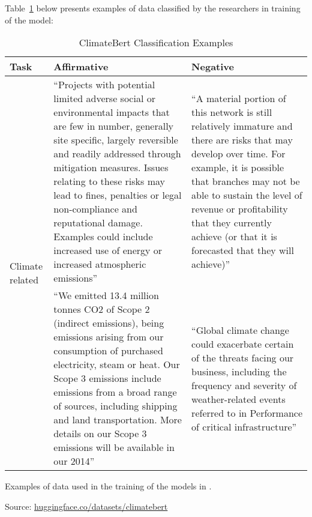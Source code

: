 \documentclass[12pt]{article}
\begin{document}
Table~\ref{data:cti:model_tab} below presents examples of data classified by the researchers in training of the model:

\begin{table}[ht]
    \caption{ClimateBert Classification Examples}\label{data:cti:model_tab}
    \centering
    \small
    \begin{tabular}{l|p{6cm}|p{6cm}}
        \toprule
        Task & Affirmative & Negative \\
        \midrule
        \multirow{8}{*}{Climate related} & ``Projects with potential limited adverse social or environmental impacts that are few in number, generally site specific, largely reversible and readily addressed through mitigation measures. Issues relating to these risks may lead to fines, penalties or legal non-compliance and reputational damage. Examples could include increased use of energy or increased atmospheric emissions'' & ``A material portion of this network is still relatively immature and there are risks that may develop over time. For example, it is possible that branches may not be able to sustain the level of revenue or profitability that they currently achieve (or that it is forecasted that they will achieve)'' \\
        \midrule
        \multirow{8}{*}{Specific} & ``We emitted 13.4 million tonnes CO2 of Scope 2 (indirect emissions), being emissions arising from our consumption of purchased electricity, steam or heat. Our Scope 3 emissions include emissions from a broad range of sources, including shipping and land transportation. More details on our Scope 3 emissions will be available in our 2014''  &  ``Global climate change could exacerbate certain of the threats facing our business, including the frequency and severity of weather-related events referred to in Performance of critical infrastructure'' \\ 
        \bottomrule
    \end{tabular}

    \vspace{0.2cm}

    \begin{tablenotes}
        \footnotesize
        \item Examples of data used in the training of the models in \textcite{binglerHowCheapTalk2024,binglerCheapTalkCherrypicking2022}.
        \item Source: \href{https://huggingface.co/datasets/climatebert/environmental_claims}{huggingface.co/datasets/climatebert}
    \end{tablenotes}
\end{table}
\end{document}
